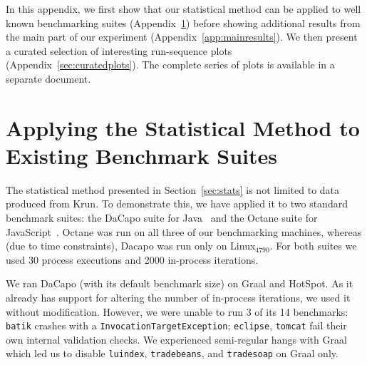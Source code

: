 \documentclass[acmsmall,screen]{acmart}
\newcommand{\bencherfive}{Linux$_\mathrm{4790}$\xspace}
\newcommand{\numpexecs}{30\xspace}
\newcommand{\numiterations}{2000\xspace}
\begin{document}


\clearpage

\appendix

\noindent In this appendix, we first show that our statistical method
can be applied to well known benchmarking suites (Appendix~\ref{sec:existing})
before showing additional results from the main part of our experiment
(Appendix~\ref{app:mainresults}). We
then present a curated selection of interesting run-sequence
plots (Appendix~\ref{sec:curatedplots}). The complete series of plots is available in a separate
document.


\section{Applying the Statistical Method to Existing Benchmark Suites}
\label{sec:existing}

The statistical method presented in Section~\ref{sec:stats} is not limited to data
produced from Krun. To demonstrate this, we have applied it to two standard
benchmark suites: the DaCapo suite for Java~\cite{dacapo06} and the Octane
suite for JavaScript~\cite{octane}. Octane was
run on all three of our benchmarking machines, whereas (due to time
constraints), Dacapo was run only on \bencherfive. For both suites we used
\numpexecs process executions and \numiterations in-process iterations.

We ran DaCapo (with its default benchmark size) on Graal and HotSpot. As it already has support for
altering the number of in-process iterations, we used it without modification.
However, we were unable to run 3 of its 14 benchmarks: \texttt{batik}
crashes with a \texttt{Invocation\-Target\-Exception}; \texttt{eclipse},
\texttt{tomcat} fail their own internal validation checks. We experienced
semi-regular hangs with Graal which led us to disable \texttt{luindex},
\texttt{tradebeans}, and \texttt{tradesoap} on Graal only.
\end{document}
